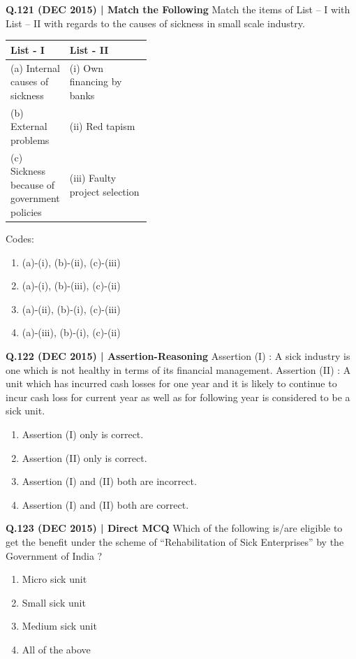 \documentclass{article}
\begin{document}
\textbf{Q.121 (DEC 2015) | Match the Following}
Match the items of List – I with List – II with regards to the causes of sickness in small scale industry.
\begin{tabularx}{\linewidth}{@{} p{0.4\linewidth} X @{}}
    \toprule
    \textbf{List - I} & \textbf{List - II} \\
    \midrule
    (a) Internal causes of sickness & (i) Own financing by banks \\
    (b) External problems & (ii) Red tapism \\
    (c) Sickness because of government policies & (iii) Faulty project selection \\
    \bottomrule
\end{tabularx}
Codes:
\begin{enumerate}[label=(\arabic*)]
    \item (a)-(i), (b)-(ii), (c)-(iii)
    \item (a)-(i), (b)-(iii), (c)-(ii)
    \item (a)-(ii), (b)-(i), (c)-(iii)
    \item (a)-(iii), (b)-(i), (c)-(ii)
\end{enumerate}

\textbf{Q.122 (DEC 2015) | Assertion-Reasoning}
Assertion (I) : A sick industry is one which is not healthy in terms of its financial management.
Assertion (II) : A unit which has incurred cash losses for one year and it is likely to continue to incur cash loss for current year as well as for following year is considered to be a sick unit.
\begin{enumerate}[label=(\arabic*)]
    \item Assertion (I) only is correct.
    \item Assertion (II) only is correct.
    \item Assertion (I) and (II) both are incorrect.
    \item Assertion (I) and (II) both are correct.
\end{enumerate}

\textbf{Q.123 (DEC 2015) | Direct MCQ}
Which of the following is/are eligible to get the benefit under the scheme of “Rehabilitation of Sick Enterprises” by the Government of India ?
\begin{enumerate}[label=(\arabic*)]
    \item Micro sick unit
    \item Small sick unit
    \item Medium sick unit
    \item All of the above
\end{enumerate}
\end{document}
